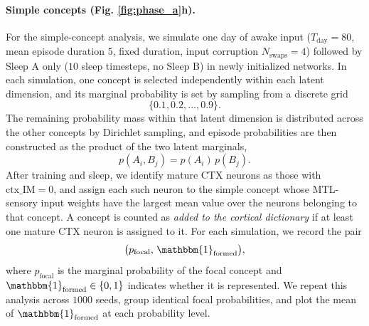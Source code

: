 \documentclass{article}
\begin{document}
\paragraph*{Simple concepts (Fig. \ref{fig:phase_a}h).}
For the simple-concept analysis, we simulate one day of awake input ($T_{\mathrm{day}}=80$, mean episode duration $5$, fixed duration, input corruption $N_{\mathrm{swaps}}=4$) followed by Sleep A only ($10$ sleep timesteps, no Sleep B) in newly initialized networks. In each simulation, one concept is selected independently within each latent dimension, and its marginal probability is set by sampling from a discrete grid
\[
\{0.1,0.2,\dots,0.9\}.
\]
The remaining probability mass within that latent dimension is distributed across the other concepts by Dirichlet sampling, and episode probabilities are then constructed as the product of the two latent marginals,
\begin{equation}
p(A_i,B_j)=p(A_i)\,p(B_j).
\end{equation}
After training and sleep, we identify mature CTX neurons as those with $\mathrm{ctx\_IM}=0$, and assign each such neuron to the simple concept whose MTL-sensory input weights have the largest mean value over the neurons belonging to that concept. A concept is counted as \emph{added to the cortical dictionary} if at least one mature CTX neuron is assigned to it. For each simulation, we record the pair
\begin{equation}
\big(p_{\mathrm{focal}},\, \mathbbm{1}_{\mathrm{formed}}\big),
\end{equation}
where $p_{\mathrm{focal}}$ is the marginal probability of the focal concept and $\mathbbm{1}_{\mathrm{formed}}\in\{0,1\}$ indicates whether it is represented. We repeat this analysis across $1000$ seeds, group identical focal probabilities, and plot the mean of $\mathbbm{1}_{\mathrm{formed}}$ at each probability level.
\end{document}
